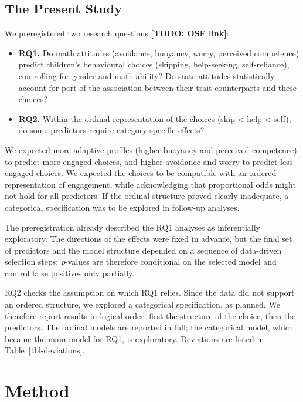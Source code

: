 \documentclass[
  man,
  floatsintext,
  longtable,
  nolmodern,
  notxfonts,
  notimes,
  colorlinks=true,linkcolor=blue,citecolor=blue,urlcolor=blue]{apa7}
\providecommand{\tightlist}{%
  \setlength{\itemsep}{0pt}\setlength{\parskip}{0pt}}
\begin{document}
\subsection{The Present Study}\label{the-present-study}

We preregistered two research questions \textbf{{[}TODO: OSF link{]}}:

\begin{itemize}
\tightlist
\item
  \textbf{RQ1.} Do math attitudes (avoidance, buoyancy, worry, perceived
  competence) predict children's behavioural choices (skipping,
  help-seeking, self-reliance), controlling for gender and math ability?
  Do state attitudes statistically account for part of the association
  between their trait counterparts and these choices?
\item
  \textbf{RQ2.} Within the ordinal representation of the choices (skip
  \textless{} help \textless{} self), do some predictors require
  category-specific effects?
\end{itemize}

We expected more adaptive profiles (higher buoyancy and perceived
competence) to predict more engaged choices, and higher avoidance and
worry to predict less engaged choices. We expected the choices to be
compatible with an ordered representation of engagement, while
acknowledging that proportional odds might not hold for all predictors.
If the ordinal structure proved clearly inadequate, a categorical
specification was to be explored in follow-up analyses.

The preregistration already described the RQ1 analyses as inferentially
exploratory. The directions of the effects were fixed in advance, but
the final set of predictors and the model structure depended on a
sequence of data-driven selection steps; \emph{p}-values are therefore
conditional on the selected model and control false positives only
partially.

RQ2 checks the assumption on which RQ1 relies. Since the data did not
support an ordered structure, we explored a categorical specification,
as planned. We therefore report results in logical order: first the
structure of the choice, then the predictors. The ordinal models are
reported in full; the categorical model, which became the main model for
RQ1, is exploratory. Deviations are listed in
Table~\ref{tbl-deviations}.

\section{Method}\label{method}
\end{document}

